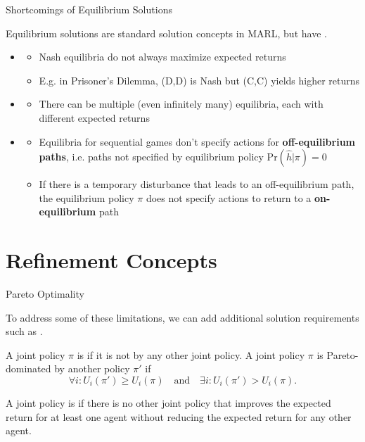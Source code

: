 \begin{frame}{Shortcomings of Equilibrium Solutions}

Equilibrium solutions are standard solution concepts in MARL, but have .
    
  \begin{itemize}
    \item<2-> 
      \begin{itemize}
        \item Nash equilibria do not always maximize expected returns
        \item E.g. in Prisoner’s Dilemma, (D,D) is Nash but (C,C) yields higher returns
      \end{itemize}
    \item<3-> 
      \begin{itemize}
        \item There can be multiple (even infinitely many) equilibria, each with different expected returns
      \end{itemize}
      \item<4-> 
      \begin{itemize}
        \item Equilibria for sequential games don't specify actions for {\bf off-equilibrium paths}, i.e. paths not specified by equilibrium policy \(\text{Pr}(\hat{h}|\pi) = 0\)
        \item If there is a temporary disturbance that leads to an off-equilibrium path, the equilibrium policy \(\pi\) does not specify actions to return to a {\bf on-equilibrium} path
    \end{itemize}
  \end{itemize}
\end{frame}

\section{Refinement Concepts}

\begin{frame}{Pareto Optimality}

 To address some of these limitations, we can add additional solution requirements such as .
 
 A joint policy \(\pi\) is  if it is not  by any other joint policy. A joint policy \(\pi\) is Pareto-dominated by another policy \(\pi'\) if
 \begin{equation*}
     \forall i: U_i(\pi') \geq U_i(\pi) \quad \text{and} \quad \exists i: U_i(\pi') > U_i(\pi).
 \end{equation*}

\begin{intuitionbox}
    A joint policy is  if there is no other joint policy that improves the expected return for at least one agent without reducing the expected return for any other agent.
\end{intuitionbox}
\end{frame}

